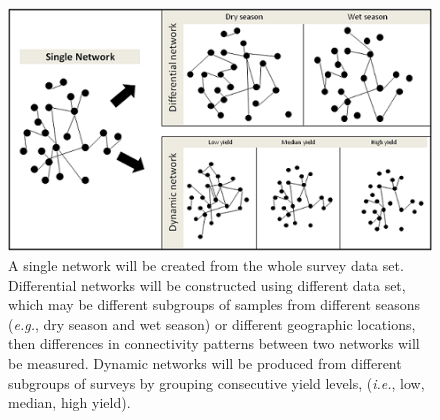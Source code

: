 \newpage
\begin{landscape}
\begin{figure}
\centering
\centerline{\includegraphics[width=8in]{wholenet}}
\caption[Network comparison]{A single network will be created from the whole survey data set. Differential networks will be constructed using different data set, which may be different subgroups of samples from different seasons (\textit{e.g.}, dry season and wet season) or different geographic locations, then differences in connectivity patterns between two networks will be measured. Dynamic networks will be produced from different subgroups of surveys by grouping consecutive yield levels, (\textit{i.e.}, low, median, high yield).}
\end{figure}
\end{landscape}

